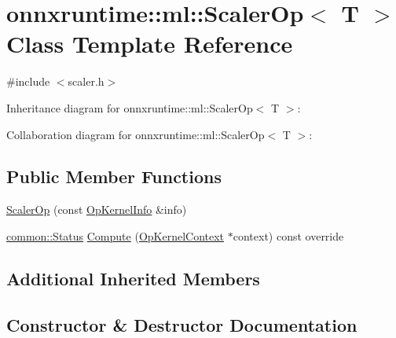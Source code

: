 \hypertarget{classonnxruntime_1_1ml_1_1ScalerOp}{}\section{onnxruntime\+:\+:ml\+:\+:Scaler\+Op$<$ T $>$ Class Template Reference}
\label{classonnxruntime_1_1ml_1_1ScalerOp}


{\ttfamily \#include $<$scaler.\+h$>$}



Inheritance diagram for onnxruntime\+:\+:ml\+:\+:Scaler\+Op$<$ T $>$\+:


Collaboration diagram for onnxruntime\+:\+:ml\+:\+:Scaler\+Op$<$ T $>$\+:
\subsection*{Public Member Functions}
\begin{DoxyCompactItemize}
\item 
\mbox{\hyperlink{classonnxruntime_1_1ml_1_1ScalerOp_abd7b86aaddf782d2dd60e6c11c37112b}{Scaler\+Op}} (const \mbox{\hyperlink{classonnxruntime_1_1OpKernelInfo}{Op\+Kernel\+Info}} \&info)
\item 
\mbox{\hyperlink{classonnxruntime_1_1common_1_1Status}{common\+::\+Status}} \mbox{\hyperlink{classonnxruntime_1_1ml_1_1ScalerOp_a7d16dffe1e1b5a5863cbe53c387c292e}{Compute}} (\mbox{\hyperlink{classonnxruntime_1_1OpKernelContext}{Op\+Kernel\+Context}} $\ast$context) const override
\end{DoxyCompactItemize}
\subsection*{Additional Inherited Members}


\subsection{Constructor \& Destructor Documentation}
\mbox{\label{classonnxruntime_1_1ml_1_1ScalerOp_abd7b86aaddf782d2dd60e6c11c37112b}} 

